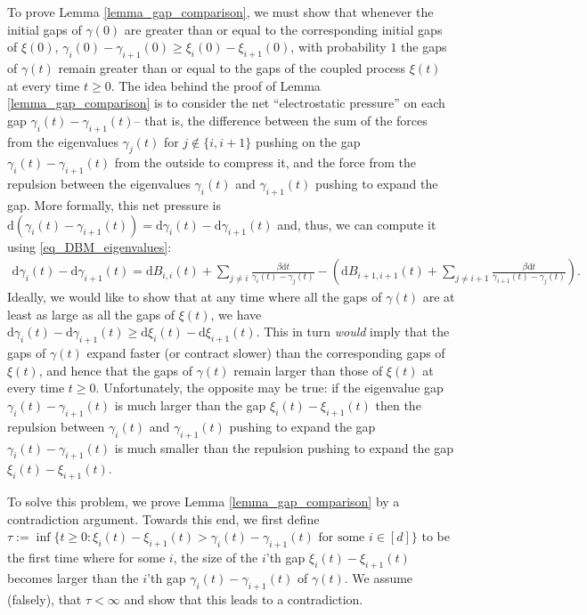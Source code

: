\documentclass[11pt,letterpaper]{article}
\begin{document}
To prove Lemma \ref{lemma_gap_comparison}, we must show that whenever the initial gaps of $\gamma(0)$ are greater than or equal to the corresponding initial gaps of $\xi(0)$, $\gamma_i(0) - \gamma_{i+1}(0) \geq \xi_i(0) - \xi_{i+1}(0)$,  with probability $1$ the gaps of $\gamma(t)$ remain greater than or equal to the gaps of the coupled process $\xi(t)$ at every time $t \geq 0$.
%
 The idea behind the proof of Lemma \ref{lemma_gap_comparison} is to consider the net ``electrostatic pressure'' on each gap $\gamma_i(t) - \gamma_{i+1}(t)$-- that is, the difference between the sum of the forces from the eigenvalues $\gamma_j(t)$ for $j \notin\{i, i+1\}$ pushing on the gap $\gamma_i(t) - \gamma_{i+1}(t)$ from the outside to compress it, and the force from the repulsion between the eigenvalues $\gamma_i(t)$ and $\gamma_{i+1}(t)$ pushing to expand the gap.
%
More formally, this net pressure is $\mathrm{d} \left(\gamma_i(t) - \gamma_{i+1}(t)\right) = \mathrm{d}\gamma_i(t) -\mathrm{d} \gamma_{i+1}(t)$ and, thus, we can compute it using \eqref{eq_DBM_eigenvalues}:
%
\begin{eqnarray} \label{eq_pressure}
     \mathrm{d} \gamma_i(t) - \mathrm{d} \gamma_{i+1} (t) =  \mathrm{d}B_{i, i}(t) +   \sum_{j \neq i} \frac{\beta \mathrm{d}t}{\gamma_i(t) - \gamma_j(t)}   -  \left(\mathrm{d}B_{i+1, i+1}(t) + \! \!  \sum_{j \neq i+1} \frac{\beta \mathrm{d}t}{\gamma_{i+1}(t) - \gamma_j(t)}  \right).
\end{eqnarray}
% 
Ideally, we would like to show that at any time where all the gaps of $\gamma(t)$ are at least as large as all the gaps of $\xi(t)$, 
we have $\mathrm{d} \gamma_i(t) - \mathrm{d} \gamma_{i+1}(t)\geq \mathrm{d} \xi_i(t) - \mathrm{d} \xi_{i+1}(t)$.
%
This in turn {\em would} imply that the gaps of $\gamma(t)$ expand faster (or contract slower) than the corresponding gaps of $\xi(t)$, and hence that the gaps of  $\gamma(t)$ remain larger than those of $\xi(t)$ at every time $t \geq 0$.
%
Unfortunately, the opposite may be true: if the eigenvalue gap $\gamma_i(t) - \gamma_{i+1}(t)$ is much larger than the gap $\xi_i(t) - \xi_{i+1}(t)$ then the repulsion between $\gamma_i(t)$ and $\gamma_{i+1}(t)$  pushing to expand the gap $\gamma_i(t) - \gamma_{i+1}(t)$ is much smaller than the repulsion pushing to expand the gap $\xi_i(t) - \xi_{i+1}(t)$.

To solve this problem, we prove Lemma  \ref{lemma_gap_comparison} by a contradiction argument.
%
Towards this end, we first define 
$\tau := \inf\{t\geq 0: \xi_i(t) - \xi_{i+1}(t) > \gamma_i(t) - \gamma_{i+1}(t) \textrm{ for some } i \in [d]  \}$  to be the first time where for some $i$,  the size of the $i$'th gap  $\xi_i(t) - \xi_{i+1}(t)$ becomes larger than the $i$'th gap  $\gamma_i(t) - \gamma_{i+1}(t)$ of $\gamma(t)$.
%
We assume (falsely), that $\tau < \infty$ and show that this leads to a contradiction.
\end{document}
